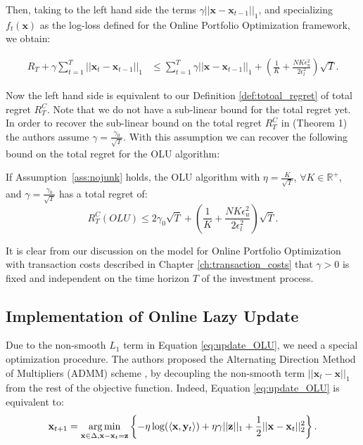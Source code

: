 Then, taking to the left hand side the terms $\gamma||\mathbf x-\mathbf x_{t-1}||_1$, and specializing $f_t(\mathbf x)$ as the log-loss defined for the Online Portfolio Optimization framework, we obtain:

\begin{equation}
\begin{aligned}
R_T+\gamma\sum\limits_{t=1}^T||\mathbf x_t-\mathbf x_{t-1}||_1
&\le \sum\limits_{t=1}^T\gamma||\mathbf x-\mathbf x_{t-1}||_1+\left( \frac{1}{K} + \frac{N K \epsilon_u^2 }{2 \epsilon_l^2} \right) \sqrt{T}.
\end{aligned}
\end{equation}

Now the left hand side is equivalent to our Definition \ref{def:totoal_regret} of total regret $R_T^C$. Note that we do not have a sub-linear bound for the total regret yet. In order to recover the sub-linear bound on the total regret $R_T^C$ in \cite{das2014online} (Theorem 1) the authors assume $\gamma=\frac{\gamma_0}{\sqrt{T}}$. With this assumption we can recover the following bound on the total regret for the OLU algorithm:

\begin{theorem}\label{th:OLU}
    If Assumption~\ref{ass:nojunk} holds, the OLU algorithm with $\eta = \frac{K}{\sqrt{T}}$, $\forall K \in \mathbb{R}^+$, and $\gamma=\frac{\gamma_0}{\sqrt T}$ has a total regret of:
    \begin{equation}\label{eq:OLU_regret}
R_T^C(OLU)\le2\gamma_0\sqrt{T}+\left( \frac{1}{K} + \frac{N K \epsilon_u^2 }{2 \epsilon_l^2} \right) \sqrt{T}.
\end{equation}

\end{theorem}

It is clear from our discussion on the model for Online Portfolio Optimization with transaction costs described in Chapter \ref{ch:transaction_costs} that $\gamma>0$ is fixed and independent on the time horizon $T$ of the investment process.

\subsection{Implementation of Online Lazy Update}

Due to the non-smooth $L_1$ term in Equation \eqref{eq:update_OLU}, we need a special optimization procedure. The authors proposed the Alternating Direction Method of Multipliers (ADMM) scheme \cite{boyd2011distributed}, by decoupling the non-smooth term $||\mathbf x_t-\mathbf x||_1$ from the rest of the objective function.
Indeed, Equation \eqref{eq:update_OLU} is equivalent to:
\begin{equation}
\mathbf x_{t+1}=\operatorname*{arg\,min}\limits_{\mathbf x\in\Delta,\mathbf x-\mathbf x_t=\mathbf z}\left\{-\eta\log(\langle\mathbf x,\mathbf y_t\rangle)+\eta\gamma||\mathbf z||_1+\frac{1}{2}||\mathbf x-\mathbf x_t||_2^2\right\}.
\end{equation}

